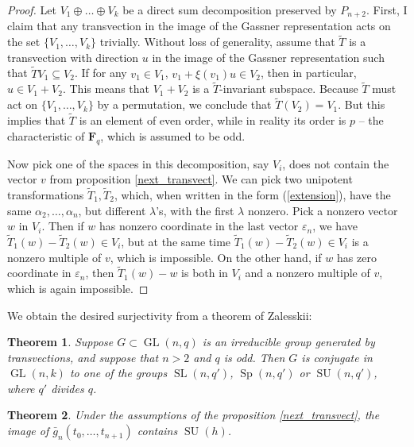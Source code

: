 \documentclass{article}
\newtheorem{theorem}{Theorem}
\theoremstyle{definition}
\DeclareMathOperator{\GL}{\mathrm{GL}}
\DeclareMathOperator{\SU}{\mathrm{SU}}
\DeclareMathOperator{\SL}{\mathrm{SL}}
\DeclareMathOperator{\Sp}{\mathrm{Sp}}
\begin{document}
	\begin{proof}
		Let $V_1 \oplus \ldots \oplus V_k$ be a direct sum decomposition preserved by $P_{n+2}$. First, I claim that any transvection in the image of the Gassner representation acts on the set $\{V_1, \ldots, V_k\}$ trivially. Without loss of generality, assume that $\tilde{T}$ is a transvection with direction $u$ in the image of the Gassner representation such that $\widetilde{T} V_1 \subseteq V_2$. If for any $v_1 \in V_1$, $v_1 + \xi(v_1)u \in V_2$, then in particular, $u \in V_1 + V_2$. This means that $V_1 + V_2$ is a $\widetilde{T}$-invariant subspace. Because $\widetilde{T}$ must act on  $\{V_1, \ldots, V_k\}$  by a permutation, we conclude that $\widetilde{T}(V_2)=V_1$. But this implies that $\widetilde{T}$ is an element of even order, while in reality its order is $p$ -- the characteristic of $\mathbf{F}_q$, which is assumed to be odd.  \par 
		Now pick one of the spaces in this decomposition, say $V_i$, does not contain the vector $v$ from proposition \ref{next_transvect}. We can pick two unipotent transformations $\widetilde{T}_1, \widetilde{T}_2$, which, when written in the form (\ref{extension}), have the same $\alpha_2, \ldots, \alpha_n$, but different $\lambda$'s, with the first $\lambda$ nonzero. Pick a nonzero vector $w$ in $V_i$. Then if $w$ has nonzero coordinate in the last vector $\varepsilon_n$, we have $\widetilde{T}_1(w)-\widetilde{T}_2(w) \in V_i$, but at the same time $\widetilde{T}_1(w)-\widetilde{T}_2(w) \in V_i$ is a nonzero multiple of $v$, which is impossible. On the other hand, if $w$ has zero coordinate in $\varepsilon_n$, then $\widetilde{T}_1(w)-w$ is both in $V_i$ and a nonzero multiple of $v$, which is again impossible. \par 
	\end{proof}
	We obtain the desired surjectivity from a theorem of Zalesskii:
	\begin{theorem} \cite{zalesskii}
		Suppose $G \subset \GL(n,q)$ is an irreducible group generated by transvections, and suppose that $n>2$ and $q$ is odd. Then $G$ is conjugate in $\GL(n, k)$ to one of the groups $\SL(n,q')$, $\Sp(n,q')$ or $\SU(n,q')$, where $q'$ divides $q$.
	\end{theorem}
	\begin{theorem} \label{next_image}
		Under the assumptions of the proposition \ref{next_transvect}, the image of $\bar{g}_n(t_0, \ldots, t_{n+1})$ contains $\SU(h)$.
	\end{theorem}
\end{document}
